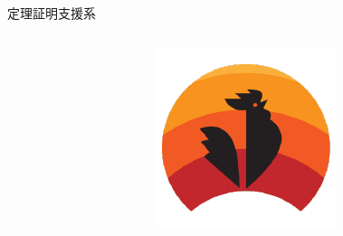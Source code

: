 \documentclass[17pt,aspectratio=169]{beamer}
\begin{document}
\begin{frame}{定理証明支援系}
\begin{columns}
\begin{column}{0.35\textwidth}
\begin{columns}
\begin{column}{0.4\textwidth}
                \end{column}
                \begin{column}{0.4\textwidth}
                    \includegraphics[width=1\linewidth]{./images/coq.png}
                \end{column}
            \end{columns}
        \end{column}
    \end{columns}


\end{frame}

\end{document}

